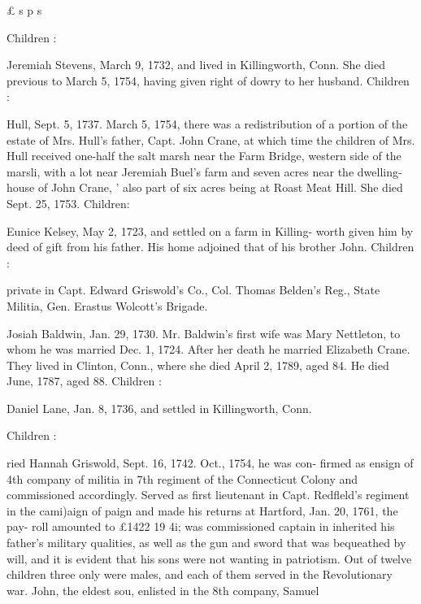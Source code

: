 \documentclass{book}
\begin{document}
£ s p s 




Children : 







Jeremiah Stevens, March 9, 1732, and lived in Killingworth, 
Conn. She died previous to March 5, 1754, having given right 
of dowry to her husband. Children : 




Hull, Sept. 5, 1737. March 5, 1754, there was a redistribution 
of a portion of the estate of Mrs. Hull's father, Capt. John Crane, 
at which time the children of Mrs. Hull received one-half the salt 
marsh near the Farm Bridge, western side of the marsli, with a 
lot near Jeremiah Buel's farm and seven acres near the dwelling- 
house of John Crane, ' also part of six acres being at Roast Meat 
Hill. She died Sept. 25, 1753. Children: 









Eunice Kelsey, May 2, 1723, and settled on a farm in Killing- 
worth given him by deed of gift from his father. His home 
adjoined that of his brother John. Children : 








private in Capt. Edward Griswold's Co., Col. Thomas 
Belden's Reg., State Militia, Gen. Erastus Wolcott's Brigade. 


Josiah Baldwin, Jan. 29, 1730. Mr. Baldwin's first wife was 
Mary Nettleton, to whom he was married Dec. 1, 1724. After her 
death he married Elizabeth Crane. They lived in Clinton, Conn., 
where she died April 2, 1789, aged 84. He died June, 1787, 
aged 88. Children : 


Daniel Lane, Jan. 8, 1736, and settled in Killingworth, Conn. 

Children : 









ried Hannah Griswold, Sept. 16, 1742. Oct., 1754, he was con- 
firmed as ensign of 4th company of militia in 7th regiment of the 
Connecticut Colony and commissioned accordingly. Served as 
first lieutenant in Capt. Redfleld's regiment in the cami)aign of 
paign and made his returns at Hartford, Jan. 20, 1761, the pay- 
roll amounted to £1422  19  4i; was commissioned captain in 
inherited his father's military qualities, as well as the gun and 
sword that was bequeathed by will, and it is evident that his sons 
were not wanting in patriotism. Out of twelve children three 
only were males, and each of them served in the Revolutionary 
war. John, the eldest sou, enlisted in the 8th company, Samuel 
\end{document}
